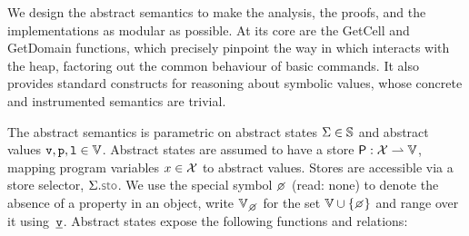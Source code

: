 %
\vspace{-2pt}
 We design the abstract semantics to make the analysis, the proofs, and the implementations as modular as possible. At its core are the GetCell and GetDomain functions, which precisely pinpoint the way in which \jsil interacts with the heap, factoring out the common behaviour of \jsil basic commands. It also provides standard constructs for reasoning about symbolic values, whose concrete and instrumented semantics are trivial.

The abstract semantics is parametric on abstract states $\Sigma \in \mathbb{S}$ and abstract values $\mathtt{v}, \mathtt{p}, \mathtt{l} \in \mathbb{V}$. 
%
Abstract states are assumed to have a store ${\sf P}: \mathcal{X} \rightharpoonup \mathbb{V}$, mapping program variables $x \in \mathcal{X}$ to abstract values. Stores are accessible via a store selector, $\absstate.\stosel$.
We use the special symbol $\none$ (read: none) to denote the absence of a property in an object, write $\setext{\absvals}{\none}$ for the set $\absvals \cup \{ \none \}$ and range over it using~$\underline{\mathtt{v}}$.
Abstract states expose the following functions and relations: 
